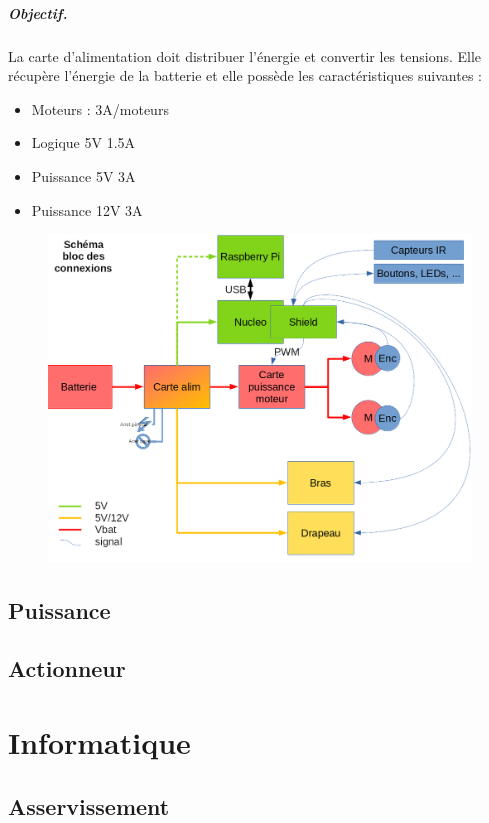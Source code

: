 \documentclass[a4paper,10pt]{report}
\theoremstyle{definition}
\begin{document}
\begin{spacing}{1.5}
\paragraph{Objectif.} La carte d'alimentation doit distribuer l'énergie et
convertir les tensions. Elle récupère l'énergie de la batterie et elle possède
les caractéristiques suivantes :
\begin{itemize}
\item Moteurs : 3A/moteurs
\item Logique 5V 1.5A
\item Puissance 5V 3A
\item Puissance 12V 3A
\end{itemize}
\begin{figure}[H]
  \center
  \includegraphics[scale=0.4]{schema_bloc_connexions.png}
\end{figure}

\label{schema1}
\section{Puissance}
\section{Actionneur}

\chapter{Informatique}
\section{Asservissement}

\end{spacing}
\end{document}
